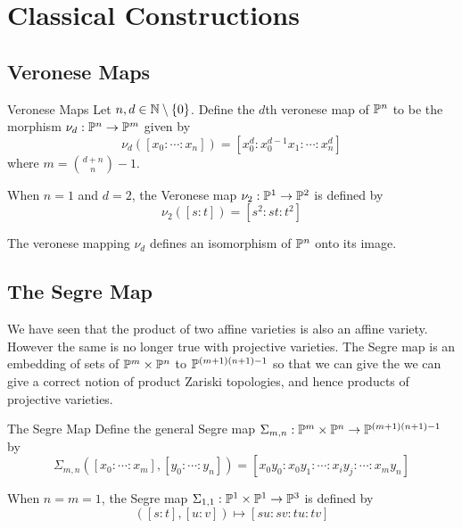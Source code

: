 \documentclass[a4paper]{article}
\begin{document}
\pagebreak
\section{Classical Constructions}
\subsection{Veronese Maps}
\begin{defn}{Veronese Maps}{} Let $n,d\in\mathbb{N}\setminus\{0\}$. Define the $d$th veronese map of $\mathbb{P}^n$ to be the morphism $\nu_d:\mathbb{P}^n\to\mathbb{P}^m$ given by $$\nu_d([x_0:\cdots:x_n])=[x_0^d:x_0^{d-1}x_1:\cdots:x_n^d]$$ where $m=\binom{d+n}{n}-1$. 
\end{defn}

When $n=1$ and $d=2$, the Veronese map $\nu_2:\mathbb{P}^1\to\mathbb{P}^2$ is defined by $$\nu_2([s:t])=[s^2:st:t^2]$$

\begin{prp}{}{} The veronese mapping $\nu_d$ defines an isomorphism of $\mathbb{P}^n$ onto its image. 
\end{prp}

\subsection{The Segre Map}
We have seen that the product of two affine varieties is also an affine variety. However the same is no longer true with projective varieties. The Segre map is an embedding of sets of $\mathbb{P}^m\times\mathbb{P}^n$ to $\mathbb{P}^{(m+1)(n+1)-1}$ so that we can give the we can give a correct notion of product Zariski topologies, and hence products of projective varieties. 

\begin{defn}{The Segre Map}{} Define the general Segre map $\Sigma_{m,n}:\mathbb{P}^m\times\mathbb{P}^n\to\mathbb{P}^{(m+1)(n+1)-1}$ by $$\Sigma_{m,n}([x_0:\cdots:x_m],[y_0:\cdots:y_n])=[x_0y_0:x_0y_1:\cdots:x_iy_j:\cdots:x_my_n]$$
\end{defn}

When $n=m=1$, the Segre map $\Sigma_{1,1}:\mathbb{P}^1\times\mathbb{P}^1\to\mathbb{P}^3$ is defined by $$([s:t],[u:v])\mapsto[su:sv:tu:tv]$$
\end{document}
